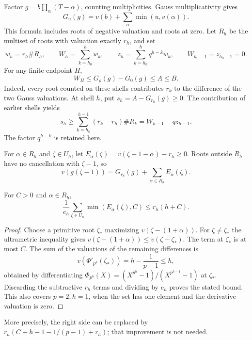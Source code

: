 Factor $g=b\prod_\alpha(T-\alpha)$, counting multiplicities.  Gauss
multiplicativity gives
\[
 G_u(g)=v(b)+\sum_\alpha\min(u,v(\alpha)).
\]
This formula includes roots of negative valuation and roots at zero.
Let $R_h$ be the multiset of roots with valuation exactly $r_h$, and set
\[
 w_h=r_h\#R_h,\qquad
 W_h=\sum_{k=h_0}^h w_k,\qquad
 z_h=\sum_{k=h_0}^h q^{h-k}w_k,
 \qquad W_{h_0-1}=z_{h_0-1}=0.
\]
For any finite endpoint $H$,
\begin{equation}\label{eq:root-budget-exact}
 W_H\leq G_\rho(g)-G_0(g)\leq A\leq B.
\end{equation}
Indeed, every root counted on these shells contributes $r_k$ to the
difference of the two Gauss valuations.  At shell $h$, put
$s_h=A-G_{r_h}(g)\geq0$.  The contribution of earlier shells yields
\begin{equation}\label{eq:exact-old-shell-slack}
 s_h\geq\sum_{k=h_0}^{h-1}(r_k-r_h)\#R_k
      = W_{h-1}-qz_{h-1}.
\end{equation}
The factor $q^{h-k}$ is retained here.

For $\alpha\in R_h$ and $\zeta\in U_h$, let
$E_\alpha(\zeta)=v(\zeta-1-\alpha)-r_h\geq0$.
Roots outside $R_h$ have no cancellation with $\zeta-1$, so
\begin{equation}\label{eq:exact-value-shell}
 v(g(\zeta-1))=G_{r_h}(g)+\sum_{\alpha\in R_h}E_\alpha(\zeta).
\end{equation}

\begin{lemma}\label{lem:capped-average-exact}
For $C>0$ and $\alpha\in R_h$,
\[
 \frac1{e_h}\sum_{\zeta\in U_h}\min(E_\alpha(\zeta),C)
 \leq r_h(h+C).
\]
\end{lemma}
\begin{proof}
Choose a primitive root $\zeta_*$ maximizing
$v(\zeta-(1+\alpha))$.  For $\zeta\ne\zeta_*$ the ultrametric
inequality gives $v(\zeta-(1+\alpha))\leq v(\zeta-\zeta_*)$.
The term at $\zeta_*$ is at most $C$.  The sum of the valuations of
the remaining differences is
\[
 v(\Phi'_{p^h}(\zeta_*))=h-\frac1{p-1}\leq h,
\]
obtained by differentiating
$\Phi_{p^h}(X)=(X^{p^h}-1)/(X^{p^{h-1}}-1)$ at $\zeta_*$.
Discarding the subtractive $r_h$ terms and dividing by $e_h$ proves
the stated bound.  This also covers $p=2,h=1$, when the set has one
element and the derivative valuation is zero.
\end{proof}

More precisely, the right side can be replaced by
$r_h(C+h-1-1/(p-1)+r_h)$; that improvement is not needed.

